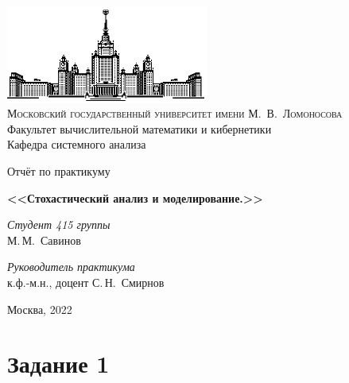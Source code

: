 \documentclass[11pt]{article}
\numberwithin{equation}{section}
\begin{document}
\thispagestyle{empty}

\begin{center}
\ \vspace{-3cm}

\includegraphics[width=0.5\textwidth]{msu.eps}\\
{\scshape Московский государственный университет имени М.~В.~Ломоносова}\\
Факультет вычислительной математики и кибернетики\\
Кафедра системного анализа

\vfill

{\LARGE Отчёт по практикуму}

\vspace{1cm}

{\Huge\bfseries <<Стохастический анализ и моделирование.>>}
\end{center}

\vspace{1cm}

\begin{flushright}
  \large
  \textit{Студент 415 группы}\\
  М.\,М.~Савинов

  \vspace{5mm}

  \textit{Руководитель практикума}\\
  к.ф.-м.н., доцент С.\,Н.~Смирнов
\end{flushright}

\vfill

\begin{center}
Москва, 2022
\end{center}
\newpage




\tableofcontents
\newpage
\section{Задание 1}
\end{document}
